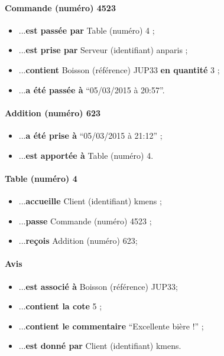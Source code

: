 \paragraph{Commande (numéro) 4523}
\begin{itemize}
	\item ...\textbf{est passée par} Table (numéro) 4 ;
	\item ...\textbf{est prise par} Serveur (identifiant) anparis ;
	\item ...\textbf{contient} Boisson (référence) JUP33 \textbf{en quantité} 3 ;		
	\item ...\textbf{a été passée à} ``05/03/2015 à 20:57''.
\end{itemize}

\paragraph{Addition (numéro) 623}
\begin{itemize}
	\item ...\textbf{a été prise à} ``05/03/2015 à 21:12'' ;
	\item ...\textbf{est apportée à} Table (numéro) 4.
\end{itemize}

\paragraph{Table (numéro) 4}
\begin{itemize}
	\item ...\textbf{accueille} Client (identifiant) kmens ;
	\item ...\textbf{passe} Commande (numéro) 4523 ;
	\item ...\textbf{reçois} Addition (numéro) 623;
\end{itemize}

\paragraph{Avis}
\begin{itemize}
	\item ...\textbf{est associé à} Boisson (référence) JUP33;
	\item ...\textbf{contient la cote} 5 ;
	\item ...\textbf{contient le commentaire} ``Excellente bière !'' ;
	\item ...\textbf{est donné par} Client (identifiant) kmens.
\end{itemize}

